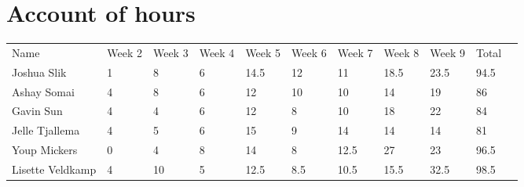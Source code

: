 \chapter{Account of hours}

\begin{table}[h]
\begin{tabular}{| l | l | l | l | l | l | l | l | l | l | l}
 Name & Week 2 & Week 3 & Week 4 & Week 5 & Week 6 & Week 7 & Week 8 & Week 9 & Total & \\
 Joshua Slik & 1 & 8 & 6 & 14.5 & 12 & 11 & 18.5 & 23.5 & 94.5 & \\
 Ashay Somai & 4 & 8 & 6 & 12 & 10 & 10 & 14 & 19 & 86 & \\
 Gavin Sun & 4 & 4 & 6 & 12 & 8 & 10 & 18 & 22 & 84 & \\
 Jelle Tjallema & 4 & 5 & 6 & 15 & 9 & 14 & 14 & 14 & 81 & \\
 Youp Mickers & 0 & 4 & 8 & 14 & 8 & 12.5 & 27 & 23 & 96.5 & \\
 Lisette Veldkamp & 4 & 10 & 5 & 12.5 & 8.5 & 10.5 & 15.5 & 32.5 & 98.5 & \\
\end{tabular}
\end{table}